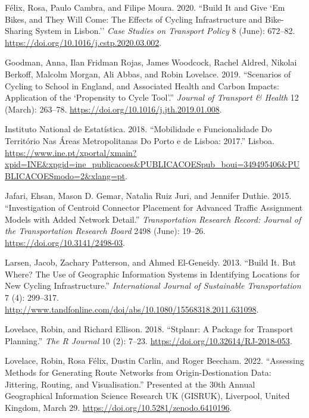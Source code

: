\documentclass{isprs} %
\newlength{\cslhangindent}
\newlength{\cslentryspacingunit} %
\newenvironment{CSLReferences}[2] %
 {%
  \setlength{\parindent}{0pt}
  \ifodd #1
  \let\oldpar\par
  \def\par{\hangindent=\cslhangindent\oldpar}
  \fi
  \setlength{\parskip}{#2\cslentryspacingunit}
 }%
 {}
\begin{document}
\begin{CSLReferences}{1}{0}
\leavevmode{}%
Félix, Rosa, Paulo Cambra, and Filipe Moura. 2020. {``Build It and Give `Em Bikes, and They Will Come: {The} Effects of Cycling Infrastructure and Bike-Sharing System in {Lisbon}.''} \emph{Case Studies on Transport Policy} 8 (June): 672--82. \url{https://doi.org/10.1016/j.cstp.2020.03.002}.

\leavevmode{}%
Goodman, Anna, Ilan Fridman Rojas, James Woodcock, Rachel Aldred, Nikolai Berkoff, Malcolm Morgan, Ali Abbas, and Robin Lovelace. 2019. {``Scenarios of Cycling to School in {England}, and Associated Health and Carbon Impacts: {Application} of the {`{Propensity} to {Cycle Tool}'}.''} \emph{Journal of Transport \& Health} 12 (March): 263--78. \url{https://doi.org/10.1016/j.jth.2019.01.008}.

\leavevmode{}%
Instituto National de Estatística. 2018. {``Mobilidade e Funcionalidade Do Território Nas {Áreas Metropolitanas} Do {Porto} e de {Lisboa}: 2017.''} {Lisboa}. \url{https://www.ine.pt/xportal/xmain?xpid=INE\&xpgid=ine_publicacoes\&PUBLICACOESpub_boui=349495406\&PUBLICACOESmodo=2\&xlang=pt}.

\leavevmode{}%
Jafari, Ehsan, Mason D. Gemar, Natalia Ruiz Juri, and Jennifer Duthie. 2015. {``Investigation of {Centroid Connector Placement} for {Advanced Traffic Assignment Models} with {Added Network Detail}.''} \emph{Transportation Research Record: Journal of the Transportation Research Board} 2498 (June): 19--26. \url{https://doi.org/10.3141/2498-03}.

\leavevmode{}%
Larsen, Jacob, Zachary Patterson, and Ahmed El-Geneidy. 2013. {``Build It. {But} Where? {The} Use of Geographic Information Systems in Identifying Locations for New Cycling Infrastructure.''} \emph{International Journal of Sustainable Transportation} 7 (4): 299--317. \url{http://www.tandfonline.com/doi/abs/10.1080/15568318.2011.631098}.

\leavevmode{}%
Lovelace, Robin, and Richard Ellison. 2018. {``Stplanr: {A Package} for {Transport Planning}.''} \emph{The R Journal} 10 (2): 7--23. \url{https://doi.org/10.32614/RJ-2018-053}.

\leavevmode{}%
Lovelace, Robin, Rosa Félix, Dustin Carlin, and Roger Beecham. 2022. {``Assessing Methods for Generating Route Networks from Origin-Destionation Data: Jittering, Routing, and Visualisation.''} Presented at the 30th {Annual Geographical Information Science Research UK} ({GISRUK}), {Liverpool, United Kingdom}, March 29. \url{https://doi.org/10.5281/zenodo.6410196}.


\end{CSLReferences}
\end{document}
